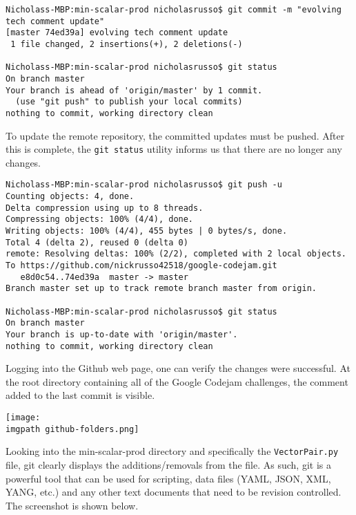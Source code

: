 \begin{verbatim}
Nicholass-MBP:min-scalar-prod nicholasrusso$ git commit -m "evolving tech comment update"
[master 74ed39a] evolving tech comment update
 1 file changed, 2 insertions(+), 2 deletions(-)

Nicholass-MBP:min-scalar-prod nicholasrusso$ git status
On branch master
Your branch is ahead of 'origin/master' by 1 commit.
  (use "git push" to publish your local commits)
nothing to commit, working directory clean
\end{verbatim}

To update the remote repository, the committed updates must be pushed. After
this is complete, the \verb|git status| utility informs us that there are no
longer any changes.

\begin{verbatim}
Nicholass-MBP:min-scalar-prod nicholasrusso$ git push -u
Counting objects: 4, done.
Delta compression using up to 8 threads.
Compressing objects: 100% (4/4), done.
Writing objects: 100% (4/4), 455 bytes | 0 bytes/s, done.
Total 4 (delta 2), reused 0 (delta 0)
remote: Resolving deltas: 100% (2/2), completed with 2 local objects.
To https://github.com/nickrusso42518/google-codejam.git
   e8d0c54..74ed39a  master -> master
Branch master set up to track remote branch master from origin.

Nicholass-MBP:min-scalar-prod nicholasrusso$ git status
On branch master
Your branch is up-to-date with 'origin/master'.
nothing to commit, working directory clean
\end{verbatim}

Logging into the Github web page, one can verify the changes were successful. At
the root directory containing all of the Google Codejam challenges, the
comment added to the last commit is visible.

    \begin{minipage}[t]{\linewidth}
	  \centering
      \texttt{[image: \\imgpath github-folders.png]}
    \end{minipage}

Looking into the min-scalar-prod directory and specifically the \verb|VectorPair.py|
file, git clearly displays the additions/removals from the file. As such, git
is a powerful tool that can be used for scripting, data files (YAML, JSON,
XML, YANG, etc.) and any other text documents that need to be revision
controlled. The screenshot is shown below.

